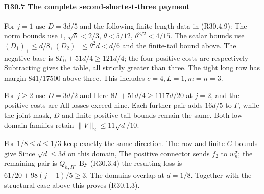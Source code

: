 \paragraph{R30.7 The complete second-shortest-three payment}
For $j=1$ use $D=3d/5$ and the following finite-length data in
(R30.4.9):
The norm bounds use $1$, $\sqrt\theta<2/3$, $\theta<5/12$,
$\theta^{3/2}<4/15$. The scalar bounds use
$(D_1)_+\le d/8$, $(D_2)_+\le\theta^2d<d/6$ and the finite-tail
bound above. The negative base is
$8\Gamma_0+51d/4\ge121d/4$; the four positive costs are respectively
Subtracting gives the table, all strictly greater than three. The
tight long row has margin $841/17500$ above three. This includes
$c=4,L=1,m=n=3$.

For $j\ge2$ use $D=3d/2$ and
Here $8\Gamma+51d/4\ge1117d/20$ at $j=2$, and the positive costs are
All losses exceed nine. Each further pair adds $16d/5$ to $\Gamma$,
while the joint mask, $D$ and finite positive-tail bounds remain the
same. Both low-domain families retain $\|V\|_2\le11\sqrt d/10$.

For $1/8\le d\le1/3$ keep exactly the same direction. The row and
finite $G$ bounds give
Since $\sqrt d\le3d$ on this domain,
The positive connector sends $\bar f_2$ to $w_n^\sigma$; the
remaining pair is $Q_{h,H}$. By (R30.3.4) the resulting loss is
$61/20+98(j-1)/5\ge3$. The domains overlap at $d=1/8$.
Together with the structural case above this proves (R30.1.3).

